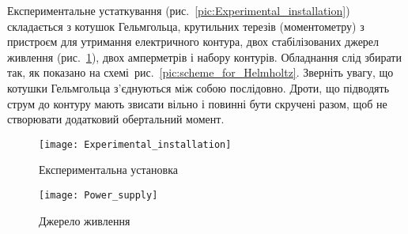 Експериментальне устаткування (рис.~\ref{pic:Experimental_installation}) складається з котушок Гельмгольца, крутильних терезів (моментометру) з пристроєм для утримання електричного контура, двох стабілізованих джерел живлення (рис.~\ref{pic:Power_supply}), двох амперметрів і набору контурів. Обладнання слід збирати так, як показано на схемі~рис.~\ref{pic:scheme_for_Helmholtz}. Зверніть увагу, що котушки Гельмгольца з'єднуються між собою послідовно. Дроти, що підводять струм до контуру мають звисати вільно і повинні бути скручені разом, щоб не створювати додатковий обертальний момент.
\begin{figure}[h!]\centering
	\begin{minipage}[t]{0.47\linewidth}
		\begin{tornpage}\centering
			\texttt{[image: Experimental\_installation]}
			\caption{Експериментальна установка}
			\label{pic:Experimental_installation}
		\end{tornpage}
	\end{minipage}
	\quad%
	\begin{minipage}[t]{0.47\linewidth}
		\begin{tornpage}\centering
			\texttt{[image: Power\_supply]}
			\caption{Джерело живлення}
			\label{pic:Power_supply}
		\end{tornpage}
	\end{minipage}
\end{figure}


